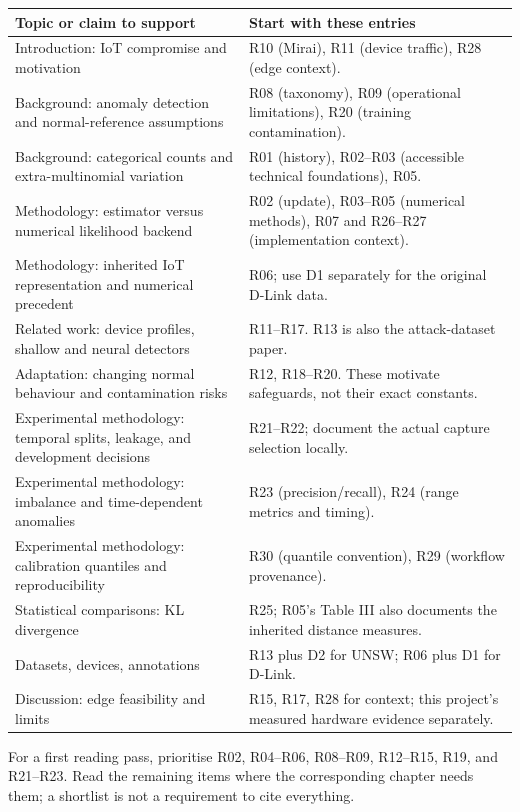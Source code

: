 \documentclass[11pt,a4paper]{article}
\begin{document}
\begin{longtable}{@{}>{\raggedright\arraybackslash}p{}
  >{\raggedright\arraybackslash}p{}@{}}
\toprule
\textbf{Topic or claim to support} & \textbf{Start with these entries} \\
\midrule
\endhead
Introduction: IoT compromise and motivation &
R10 (Mirai), R11 (device traffic), R28 (edge context). \\
Background: anomaly detection and normal-reference assumptions &
R08 (taxonomy), R09 (operational limitations), R20 (training contamination). \\
Background: categorical counts and extra-multinomial variation &
R01 (history), R02--R03 (accessible technical foundations), R05. \\
Methodology: estimator versus numerical likelihood backend &
R02 (update), R03--R05 (numerical methods), R07 and R26--R27 (implementation context). \\
Methodology: inherited IoT representation and numerical precedent &
R06; use D1 separately for the original D-Link data. \\
Related work: device profiles, shallow and neural detectors &
R11--R17. R13 is also the attack-dataset paper. \\
Adaptation: changing normal behaviour and contamination risks &
R12, R18--R20. These motivate safeguards, not their exact constants. \\
Experimental methodology: temporal splits, leakage, and development decisions &
R21--R22; document the actual capture selection locally. \\
Experimental methodology: imbalance and time-dependent anomalies &
R23 (precision/recall), R24 (range metrics and timing). \\
Experimental methodology: calibration quantiles and reproducibility &
R30 (quantile convention), R29 (workflow provenance). \\
Statistical comparisons: KL divergence &
R25; R05's Table III also documents the inherited distance measures. \\
Datasets, devices, annotations &
R13 plus D2 for UNSW; R06 plus D1 for D-Link. \\
Discussion: edge feasibility and limits &
R15, R17, R28 for context; this project's measured hardware evidence separately. \\
\bottomrule
\end{longtable}

For a first reading pass, prioritise R02, R04--R06, R08--R09, R12--R15,
R19, and R21--R23. Read the remaining items where the corresponding chapter
needs them; a shortlist is not a requirement to cite everything.
\end{document}
